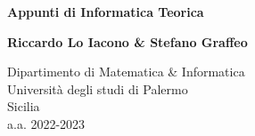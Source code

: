\documentclass{subfiles}
\begin{document}
\begin{titlepage}
    \begin{center}
        \vspace*{1cm}

        \textbf{Appunti di Informatica Teorica}

        \vspace{1.5cm}

        \textbf{Riccardo Lo Iacono \& Stefano Graffeo}

        \vfill

        \vspace{0.8cm}

        Dipartimento di Matematica \& Informatica\\
        Università degli studi di Palermo\\
        Sicilia\\
        a.a. 2022-2023

    \end{center}
\end{titlepage}
\end{document}
